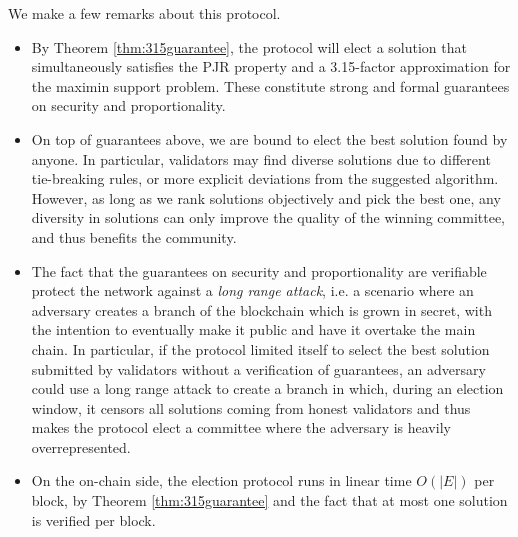 We make a few remarks about this protocol. 
\begin{itemize}
\item By Theorem \ref{thm:315guarantee}, the protocol will elect a solution that simultaneously satisfies the PJR property and a 3.15-factor approximation for the maximin support problem. These constitute strong and formal guarantees on security and proportionality. 
\item On top of guarantees above, we are bound to elect the best solution found by anyone. In particular, validators may find diverse solutions due to different tie-breaking rules, or more explicit deviations from the suggested algorithm. However, as long as we rank solutions objectively and pick the best one, any diversity in solutions can only improve the quality of the winning committee, and thus benefits the community.
\item The fact that the guarantees on security and proportionality are verifiable protect the network against a \emph{long range attack}, i.e. a scenario where an adversary creates a branch of the blockchain which is grown in secret, with the intention to eventually make it public and have it overtake the main chain. In particular, if the protocol limited itself to select the best solution submitted by validators without a verification of guarantees, an adversary could use a long range attack to create a branch in which, during an election window, it censors all solutions coming from honest validators and thus makes the protocol elect a committee where the adversary is heavily overrepresented.
\item On the on-chain side, the election protocol runs in linear time $O(|E|)$ per block, by Theorem \ref{thm:315guarantee} and the fact that at most one solution is verified per block.  
\end{itemize}

